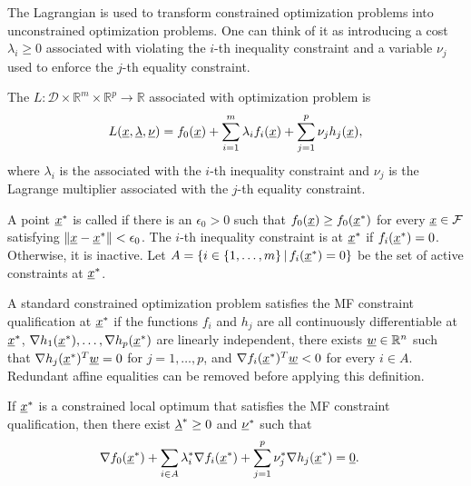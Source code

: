 The Lagrangian is used to transform constrained optimization problems into unconstrained optimization problems.
One can think of it as introducing a cost $\lambda_i \geq 0$ associated with violating the $i$-th inequality constraint and a variable $\nu_j$ used to enforce the $j$-th equality constraint.

\begin{definition} \label{def:lagrangian}
The  $L \colon \mathcal{D} \times \mathbb{R}^m \times \mathbb{R}^p \rightarrow \mathbb{R}$ associated with optimization problem is
\[ L(\underline{x},\underline{\lambda},\underline{\nu}) = f_0(\underline{x}) + \sum_{i=1}^m \lambda_i f_i(\underline{x}) + \sum_{j=1}^p \nu_j h_j(\underline{x}), \]
where $\lambda_i$ is the  associated with the $i$-th inequality constraint and $\nu_j$ is the Lagrange multiplier associated with the $j$-th equality constraint.
\end{definition}

\begin{definition}
A point $\underline{x}^*$ is called  if there is an $\epsilon_0>0$ such that $f_0(\underline{x})\geq f_0(\underline{x}^*)$ for every $\underline{x}\in\mathcal F$ satisfying $\|\underline{x}-\underline{x}^*\|<\epsilon_0$.
The $i$-th inequality constraint is  at $\underline{x}^*$ if $f_i (\underline{x}^*)=0$.
Otherwise, it is inactive.
Let $A = \{ i\in \{1,\ldots,m\} \, | \, f_i (\underline{x}^*)=0 \}$ be the set of active constraints at $\underline{x}^*$.
\end{definition}

\begin{definition}
A standard constrained optimization problem satisfies the MF constraint qualification at $\underline{x}^*$ if the functions $f_i$ and $h_j$ are all continuously differentiable at $\underline{x}^*$, $\nabla h_1(\underline{x}^*),\ldots,\nabla h_p(\underline{x}^*)$ are linearly independent, there exists $\underline w\in\mathbb R^n$ such that $\nabla h_j(\underline{x}^*)^T\underline w=0$ for $j = 1,\ldots,p$, and $\nabla f_i(\underline{x}^*)^T\underline w<0$ for every $i\in A$.
Redundant affine equalities can be removed before applying this definition.
\end{definition}

\begin{theorem}
\label{theorem:KKT}
If $\underline{x}^*$ is a constrained local optimum that satisfies the MF constraint qualification, then there exist $\underline{\lambda}^* \geq 0$ and $\underline{\nu}^*$ such that
\begin{align}
\label{eq:KKT1} \nabla f_0 (\underline{x}^*) + \sum_{i\in A} \lambda_i^* \nabla f_i (\underline{x}^*) + \sum_{j=1}^p \nu_j^* \nabla h_j (\underline{x}^*) &= \underline{0}.
\end{align}
\end{theorem}


